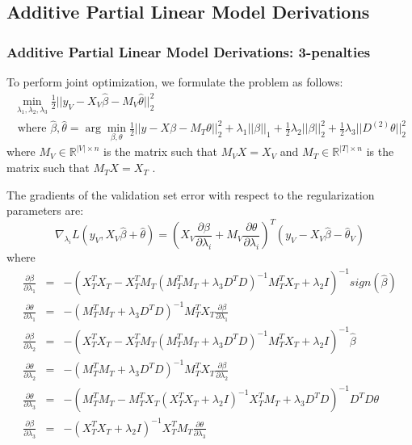 \documentclass[10pt,letterpaper]{article}
\begin{document}
\subsection{Additive Partial Linear Model Derivations}

\subsubsection{Additive Partial Linear Model Derivations: 3-penalties}

To perform joint optimization, we formulate the problem as follows:
\begin{multline}
\min_{\lambda_1, \lambda_2, \lambda_3} \frac{1}{2} \bigl\lvert\bigl\lvert y_V - X_V\hat\beta - M_V \hat\theta \bigl\rvert\bigl\rvert^2_2 \\
\text{ where } \hat\beta, \hat\theta = \arg\min_{\beta, \theta} \frac{1}{2} \bigl\lvert\bigl\lvert y - X\beta - M_T \theta \bigl\rvert\bigl\rvert^2_2
+ \lambda_1 \lvert\lvert \beta \rvert \rvert_1
+ \frac{1}{2} \lambda_2 \lvert\lvert \beta \rvert \rvert_2^2
+ \frac{1}{2} \lambda_3 \lvert\lvert D^{(2)} \theta \rvert \rvert_2^2
\end{multline}
where $M_V \in \mathbb{R}^{|V| \times n}$ is the matrix such that $M_V X = X_V$ and $M_T \in \mathbb{R}^{|T| \times n}$ is the matrix such that $M_T X = X_T$ .

The gradients of the validation set error with respect to the regularization parameters are:
\begin{equation}
\nabla_{\lambda_i} L(y_V, X_V \hat \beta + \hat \theta) = (X_V \frac{\partial \beta}{\partial \lambda_i} + M_V \frac{\partial \theta}{\partial \lambda_i})^T(y_V - X_V \hat \beta - \hat \theta_V)
\end{equation}
where
\begin{equation}
\begin{array}{lcl}
\frac{\partial \beta}{\partial \lambda_1} &=& -(X_T^T X_T - X_T^T M_T(M_T^T M_T + \lambda_3 D^TD)^{-1} M_T^T X_T + \lambda_2 I)^{-1} sign(\hat \beta) \\
\frac{\partial \theta}{\partial \lambda_1} &=& -(M_T^T M_T + \lambda_3 D^T D)^{-1}  M_T^T X_T \frac{\partial \beta}{\partial \lambda_1}
\\
\frac{\partial \beta}{\partial \lambda_2} &=& -(X_T^T X_T - X_T^T M_T(M_T^T M_T + \lambda_3 D^TD)^{-1} M_T^T X_T + \lambda_2 I)^{-1} \hat \beta \\
\frac{\partial \theta}{\partial \lambda_2} &=& -(M_T^T M_T + \lambda_3 D^T D)^{-1}  M_T^T X_T \frac{\partial \beta}{\partial \lambda_2}
\\
\frac{\partial \theta}{\partial \lambda_3} &=& -(M_T^T M_T - M_T^T X_T (X_T^TX_T + \lambda_2 I)^{-1} X_T^T M_T + \lambda_3 D^TD)^{-1} D^TD \theta
\\
\frac{\partial \beta}{\partial \lambda_3} &=& - (X_T^TX_T + \lambda_2 I)^{-1} X_T^T M_T \frac{\partial \theta}{\partial \lambda_3} \\
\end{array}
\end{equation}
\end{document}
